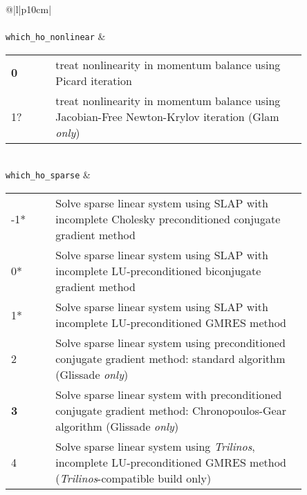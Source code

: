 \begin{center}
\begin{supertabular*}{\textwidth}{@{\extracolsep{\fill}}|l|p{10cm}|}
    \hline
    \hline
    \hline
    \\
    \hline
    \\
    \hline
    \texttt{which\_ho\_nonlinear} & 
    \begin{tabular}[t]{lp{0.85\linewidth}}
      {\bf 0} & treat nonlinearity in momentum balance using Picard iteration \\
      1? & treat nonlinearity in momentum balance using Jacobian-Free Newton-Krylov iteration (Glam \textit{only})  \\
    \end{tabular}\\     
    \texttt{which\_ho\_sparse} & 
    \begin{tabular}[t]{lp{0.85\linewidth}}
      -1* & Solve sparse linear system using SLAP with incomplete Cholesky preconditioned conjugate gradient method\\
      0* & Solve sparse linear system using SLAP with incomplete LU-preconditioned biconjugate gradient method\\
      1* & Solve sparse linear system using SLAP with incomplete LU-preconditioned GMRES method\\
      2 & Solve sparse linear system using preconditioned conjugate gradient method: standard algorithm (Glissade \textit{only}) \\
      {\bf 3} & Solve sparse linear system with preconditioned conjugate gradient method: Chronopoulos-Gear algorithm (Glissade \textit{only})\\
      4 & Solve sparse linear system using \textit{Trilinos}, incomplete LU-preconditioned GMRES method (\textit{Trilinos}-compatible build only)\\
    \end{tabular}\\     

\end{supertabular*}
\end{center}

